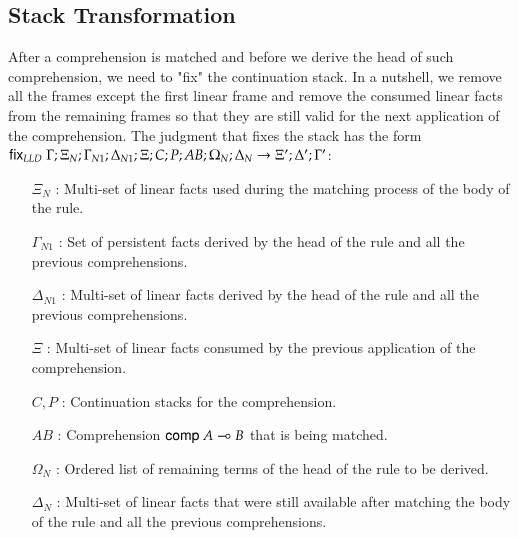 \subsection{Stack Transformation}

After a comprehension is matched and before we derive the head of such comprehension, we need to "fix" the continuation stack. In a nutshell, we remove all the frames except the first linear frame and remove the consumed linear facts from the remaining frames so that they are still valid for the next application of the comprehension.
The judgment that fixes the stack has the form $\mathsf{fix}_{LLD} \; \Gamma; \Xi_N; \Gamma_{N1}; \Delta_{N1}; \Xi; C; P; AB; \Omega_N; \Delta_N \rightarrow \Xi'; \Delta'; \Gamma'$:

\begin{enumerate}
   \item[$\Xi_N$]: Multi-set of linear facts used during the matching process of the body of the rule.
   \item[$\Gamma_{N1}$]: Set of persistent facts derived by the head of the rule and all the previous comprehensions.
   \item[$\Delta_{N1}$]: Multi-set of linear facts derived by the head of the rule and all the previous comprehensions.
   \item[$\Xi$]: Multi-set of linear facts consumed by the previous application of the comprehension.
   \item[$C, P$]: Continuation stacks for the comprehension.
   \item[$AB$]: Comprehension $\mathsf{comp} \; A \multimap B$ that is being matched.
   \item[$\Omega_N$]: Ordered list of remaining terms of the head of the rule to be derived.
   \item[$\Delta_N$]: Multi-set of linear facts that were still available after matching the body of the rule and all the previous comprehensions.
\end{enumerate}

